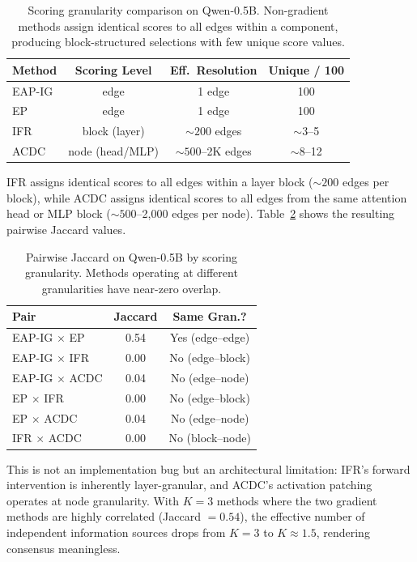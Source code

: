 \documentclass[11pt,a4paper]{article}
\begin{document}
\begin{table}[t]
\centering
\small
\begin{tabular}{lccc}
\toprule
\textbf{Method} & \textbf{Scoring Level} & \textbf{Eff.~Resolution} & \textbf{Unique / 100} \\
\midrule
EAP-IG & edge & 1 edge & 100 \\
EP & edge & 1 edge & 100 \\
IFR & block (layer) & ${\sim}200$ edges & ${\sim}3$--5 \\
ACDC & node (head/MLP) & ${\sim}500$--2K edges & ${\sim}8$--12 \\
\bottomrule
\end{tabular}
\caption{Scoring granularity comparison on Qwen-0.5B. Non-gradient methods assign identical scores to all edges within a component, producing block-structured selections with few unique score values.}
\label{tab:granularity}
\end{table}

IFR assigns identical scores to all edges within a layer block (${\sim}200$ edges per block), while ACDC assigns identical scores to all edges from the same attention head or MLP block (${\sim}500$--2{,}000 edges per node). Table~\ref{tab:granularity-jaccard} shows the resulting pairwise Jaccard values.

\begin{table}[t]
\centering
\small
\begin{tabular}{lcc}
\toprule
\textbf{Pair} & \textbf{Jaccard} & \textbf{Same Gran.?} \\
\midrule
EAP-IG $\times$ EP & 0.54 & Yes (edge--edge) \\
EAP-IG $\times$ IFR & 0.00 & No (edge--block) \\
EAP-IG $\times$ ACDC & 0.04 & No (edge--node) \\
EP $\times$ IFR & 0.00 & No (edge--block) \\
EP $\times$ ACDC & 0.04 & No (edge--node) \\
IFR $\times$ ACDC & 0.00 & No (block--node) \\
\bottomrule
\end{tabular}
\caption{Pairwise Jaccard on Qwen-0.5B by scoring granularity. Methods operating at different granularities have near-zero overlap.}
\label{tab:granularity-jaccard}
\end{table}

This is not an implementation bug but an architectural limitation: IFR's forward intervention is inherently layer-granular, and ACDC's activation patching operates at node granularity. With $K=3$ methods where the two gradient methods are highly correlated (Jaccard $=0.54$), the effective number of independent information sources drops from $K=3$ to $K \approx 1.5$, rendering consensus meaningless.
\end{document}
